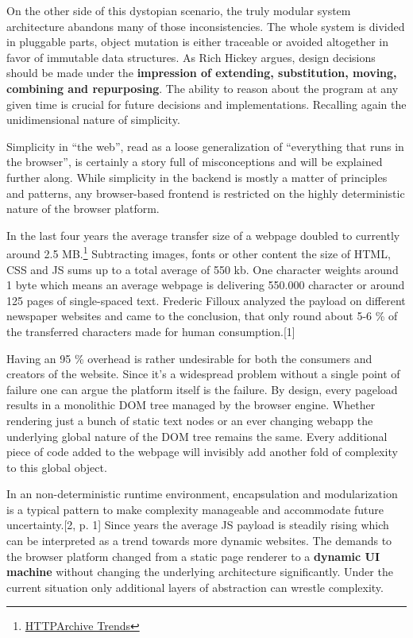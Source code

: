 \documentclass[]{article}
\begin{document}
On the other side of this dystopian scenario, the truly modular system
architecture abandons many of those inconsistencies. The whole system is
divided in pluggable parts, object mutation is either traceable or
avoided altogether in favor of immutable data structures. As Rich Hickey
argues, design decisions should be made under the \textbf{impression of
extending, substitution, moving, combining and repurposing}. The ability
to reason about the program at any given time is crucial for future
decisions and implementations. Recalling again the unidimensional nature
of simplicity.

Simplicity in ``the web'', read as a loose generalization of
``everything that runs in the browser'', is certainly a story full of
misconceptions and will be explained further along. While simplicity in
the backend is mostly a matter of principles and patterns, any
browser-based frontend is restricted on the highly deterministic nature
of the browser platform.

In the last four years the average transfer size of a webpage doubled to
currently around 2.5 MB.\footnote{\href{http://httparchive.org/trends.php}{HTTPArchive
  Trends}} Subtracting images, fonts or other content the size of HTML,
CSS and JS sums up to a total average of 550 kb. One character weights
around 1 byte which means an average webpage is delivering 550.000
character or around 125 pages of single-spaced text. Frederic Filloux
analyzed the payload on different newspaper websites and came to the
conclusion, that only round about 5-6 \% of the transferred characters
made for human consumption.{[}1{]}

Having an 95 \% overhead is rather undesirable for both the consumers
and creators of the website. Since it's a widespread problem without a
single point of failure one can argue the platform itself is the
failure. By design, every pageload results in a monolithic DOM tree
managed by the browser engine. Whether rendering just a bunch of static
text nodes or an ever changing webapp the underlying global nature of
the DOM tree remains the same. Every additional piece of code added to
the webpage will invisibly add another fold of complexity to this global
object.

In an non-deterministic runtime environment, encapsulation and
modularization is a typical pattern to make complexity manageable and
accommodate future uncertainty.{[}2, p. 1{]} Since years the average JS
payload is steadily rising which can be interpreted as a trend towards
more dynamic websites. The demands to the browser platform changed from
a static page renderer to a \textbf{dynamic UI machine} without changing
the underlying architecture significantly. Under the current situation
only additional layers of abstraction can wrestle complexity.
\end{document}
